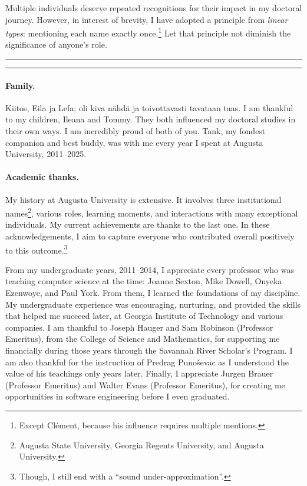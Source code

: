 Multiple individuals deserve repeated recognitions for their impact in my doctoral journey.
However, in interest of brevity, I have adopted a principle from \emph{linear types}: mentioning each name exactly once.\footnote{Except Clément, because his influence requires multiple mentions.}
Let that principle not diminish the significance of anyone's role. %

\noindent\hfil\rule{0.25\textwidth}{.4pt}\hspace{1em}\raisebox{-0.5\height}{\SixFlowerAltPetal}\hspace{1em}\rule{0.25\textwidth}{.4pt}\hfil

\paragraph*{Family.}
Kiitos, Eila ja Lefa; oli kiva nähdä ja toivottavasti tavataan taas.
I am thankful to my children, Ileana and Tommy.
They both influenced my doctoral studies in their own ways.
I am incredibly proud of both of you.
Tank, my fondest companion and best buddy, was with me every year I spent at Augusta University, 2011--2025.

\paragraph*{Academic thanks.}
My history at {Augusta University} is extensive.
It involves three institutional names\footnote{Augusta State University, Georgia Regents University, and Augusta University.},
various roles, learning moments, and interactions with many exceptional individuals.
My current achievements are thanks to the last one.
In these acknowledgements, I aim to capture everyone who contributed overall positively to this outcome.\footnote{Though, I still end with a \enquote{sound under-approximation}.}

From my undergraduate years, 2011--2014, I appreciate every professor who was teaching computer science at the time: Joanne Sexton, Mike Dowell, Onyeka Ezenwoye, and Paul York.
From them, I learned the foundations of my discipline.
My undergraduate experience was encouraging, nurturing, and provided the skills that helped me succeed later, at Georgia Institute of Technology and various companies.
I am thankful to Joseph Hauger and Sam Robinson (Professor Emeritus), from the College of Science and Mathematics, for supporting me financially during those years through the Savannah River Scholar's Program.
I am also thankful for the instruction of Predrag Punoševac as I understood the value of his teachings only years later.
Finally, I appreciate Jurgen Brauer (Professor Emeritus) and Walter Evans (Professor Emeritus), for creating me opportunities in software engineering before I even graduated.

